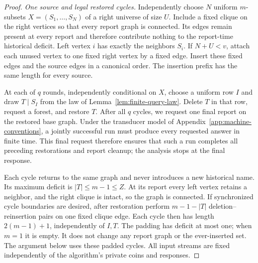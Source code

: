\documentclass[11pt,letterpaper]{article}
\numberwithin{equation}{section}
\begin{document}
\begin{proof}
\emph{One source and legal restored cycles.} Independently choose $N$ uniform $m$-subsets $X=(S_1,\ldots,S_N)$ of a right universe of size $U$.
Include a fixed clique on the right vertices so that every report graph is connected.
Its edges remain present at every report and therefore contribute nothing to the report-time historical deficit.
Left vertex $i$ has exactly the neighbors $S_i$.
If $N+U<v$, attach each unused vertex to one fixed right vertex by a fixed edge.
Insert these fixed edges and the source edges in a canonical order.
The insertion prefix has the same length for every source.

At each of $q$ rounds, independently conditional on $X$, choose a uniform row $I$ and draw $T\mid S_I$ from the law of Lemma~\ref{lem:finite-query-law}.
Delete $T$ in that row, request a forest, and restore $T$.
After all $q$ cycles, we request one final report on the restored base graph.
Under the transducer model of Appendix~\ref{app:machine-conventions}, a jointly successful run must produce every requested answer in finite time.
This final request therefore ensures that such a run completes all preceding restorations and report cleanup; the analysis stops at the final response.

Each cycle returns to the same graph and never introduces a new historical name.
Its maximum deficit is $|T|\le m-1\le Z$.
At its report every left vertex retains a neighbor, and the right clique is intact, so the graph is connected.
If synchronized cycle boundaries are desired, after restoration perform $m-1-|T|$ deletion--reinsertion pairs on one fixed clique edge.
Each cycle then has length $2(m-1)+1$, independently of $I,T$.
The padding has deficit at most one; when $m=1$ it is empty.
It does not change any report graph or the ever-inserted set.
The argument below uses these padded cycles.
All input streams are fixed independently of the algorithm's private coins and responses.


\end{proof}
\end{document}
